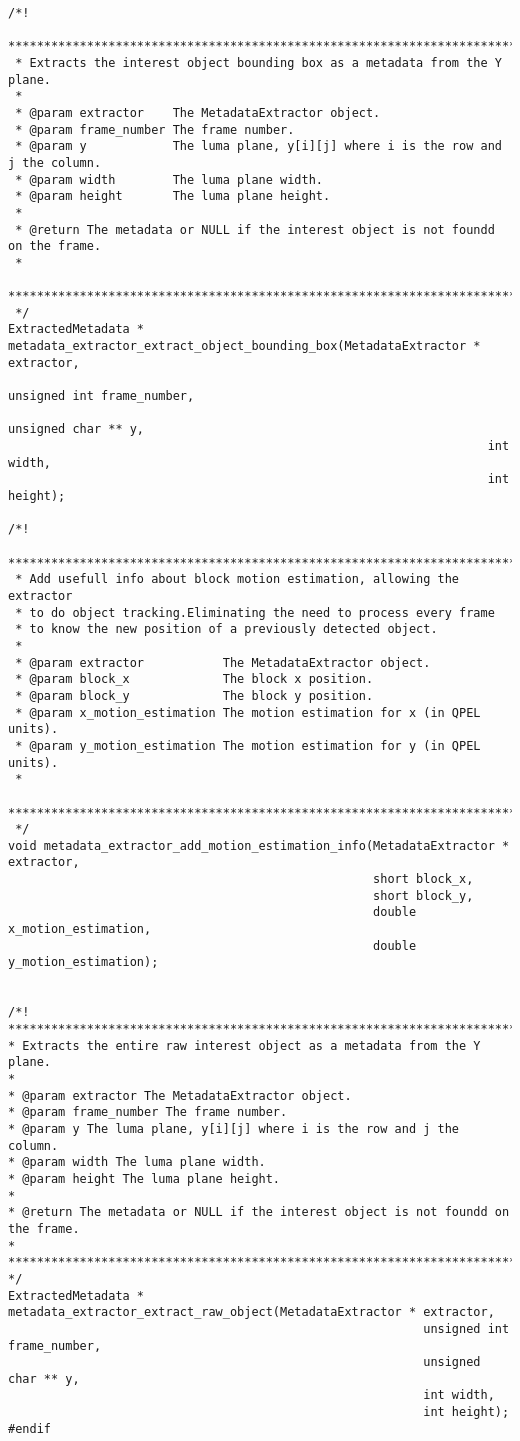 \begin{lstlisting}
/*!
 *********************************************************************************
 * Extracts the interest object bounding box as a metadata from the Y plane.
 *
 * @param extractor    The MetadataExtractor object.
 * @param frame_number The frame number.
 * @param y            The luma plane, y[i][j] where i is the row and j the column.
 * @param width        The luma plane width.
 * @param height       The luma plane height.
 *
 * @return The metadata or NULL if the interest object is not foundd on the frame.
 *
 *********************************************************************************
 */
ExtractedMetadata * metadata_extractor_extract_object_bounding_box(MetadataExtractor * extractor,
                                                                   unsigned int frame_number,
                                                                   unsigned char ** y,
                                                                   int width,
                                                                   int height);

/*!
 *********************************************************************************
 * Add usefull info about block motion estimation, allowing the extractor 
 * to do object tracking.Eliminating the need to process every frame 
 * to know the new position of a previously detected object.
 *
 * @param extractor           The MetadataExtractor object.
 * @param block_x             The block x position.
 * @param block_y             The block y position.
 * @param x_motion_estimation The motion estimation for x (in QPEL units). 
 * @param y_motion_estimation The motion estimation for y (in QPEL units).
 *
 *********************************************************************************
 */
void metadata_extractor_add_motion_estimation_info(MetadataExtractor * extractor,
                                                   short block_x, 
                                                   short block_y,
                                                   double x_motion_estimation,
                                                   double y_motion_estimation);


/*!
*********************************************************************************
* Extracts the entire raw interest object as a metadata from the Y plane.
*
* @param extractor The MetadataExtractor object.
* @param frame_number The frame number.
* @param y The luma plane, y[i][j] where i is the row and j the column.
* @param width The luma plane width.
* @param height The luma plane height.
*
* @return The metadata or NULL if the interest object is not foundd on the frame.
*
*********************************************************************************
*/
ExtractedMetadata * metadata_extractor_extract_raw_object(MetadataExtractor * extractor,
                                                          unsigned int frame_number,
                                                          unsigned char ** y,
                                                          int width,
                                                          int height);
#endif

\end{lstlisting}


